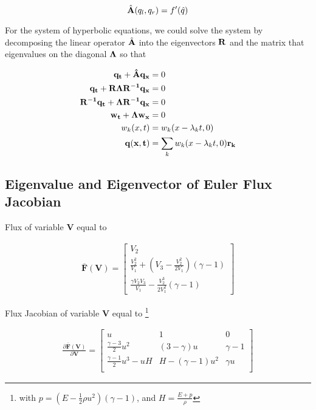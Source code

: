\documentclass[11pt]{diazessay} %
\begin{document}
\begin{equation}
    \hat{\bf{A}}(q_l, q_r) = f'(\hat{q})
\end{equation}

For the system of hyperbolic equations, we could solve the system by decomposing the linear operator $\hat{\bf{A}}$ into the eigenvectors $\bf{R}$ and the matrix that eigenvalues on the diagonal $\bf{\Lambda}$ so that

$$
\begin{aligned}
    \bf{q}_t + \hat{\bf{A}} \bf{q}_x  &= 0\\
    \bf{q}_t + \bf{R}\Lambda\bf{R}^{-1}\bf{q}_x & = 0\\
    \bf{R}^{-1}\bf{q}_t + \Lambda\bf{R}^{-1}\bf{q}_x & = 0\\
    \bf{w}_t + \Lambda\bf{w}_x & = 0\\
    w_k(x, t) & = w_k(x-\lambda_k t, 0)\\
    \bf{q}(x, t) & = \sum_k w_k(x-\lambda_k t, 0) \bf{r_k}
\end{aligned}
$$


\subsection{Eigenvalue and Eigenvector of Euler Flux Jacobian}

    Flux of variable $\textbf{V}$ equal to
    
    $$
    \begin{aligned}
        \bar{\textbf{F}}(\textbf{V})= \begin{bmatrix}
            V_2\\ 
            \frac{V_2^2}{V_1} + \left(V_3 - \frac{V_2^2}{2V_1}\right) (\gamma -1)\\
            \frac{\gamma V_2V_3}{V_1} - \frac{V_2^3}{2V_1^2}(\gamma -1)
        \end{bmatrix}
    \end{aligned}
    $$


    Flux Jacobian of variable $\textbf{V}$ equal to \footnote{with $p = (E - \frac{1}{2}\rho u^2)(\gamma -1)$, and $H=\frac{E+p}{\rho}$}

    $$
    \begin{aligned}
        \frac{\partial \bar{\textbf{F}}(\textbf{V})}{\partial \textbf{V}}= \begin{bmatrix}
            u & 1 & 0 \\
            \frac{\gamma -3}{2} u^2 & (3-\gamma)u & \gamma -1\\
            \frac{\gamma -1}{2}u^3-uH & H-(\gamma -1)u^2 & \gamma u\\
        \end{bmatrix}
    \end{aligned}
    $$
\end{document}
